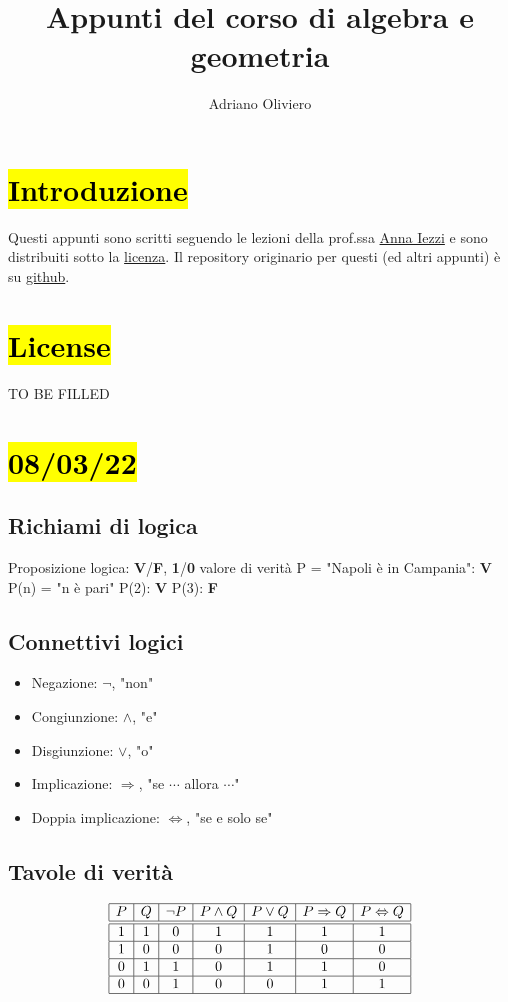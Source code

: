 \documentclass{article}
\begin{document}
% 
\newcommand{\Def}[2]{\paragraph{\underline{Def}:}#1\\\hspace*{3em}\begin{minipage}{.8\textwidth}#2\end{minipage}}
\newcommand{\R}{\mathbb{R}}
\title{Appunti del corso di algebra e geometria}
\author{Adriano Oliviero}
\section*{\hl{Introduzione}}
Questi appunti sono scritti seguendo le lezioni della prof.ssa \href{https://aiezzi.it/}{Anna Iezzi} e sono distribuiti sotto la \hyperref[sec:License]{licenza}. Il repository originario per questi (ed altri appunti) è su \href{https://github.com/TheDarkBug/notes}{github}.

\section*{\hl{License}}
\label{sec:License}
TO BE FILLED
\section*{\hl{08/03/22}}
\subsection*{Richiami di logica}
Proposizione logica: \textbf{V}/\textbf{F}, \textbf{1}/\textbf{0} valore di verità
P = "Napoli è in Campania": \textbf{V}
P(n) = "n è pari"
P(2): \textbf{V}
P(3): \textbf{F}
\subsection*{Connettivi logici}
\begin{itemize}
	\item Negazione: $\neg$, "non"
	\item Congiunzione: $\wedge$, "e"
	\item Disgiunzione: $\vee$, "o"
	\item Implicazione: $\Rightarrow$, "se $\cdots$ allora $\cdots$"
	\item Doppia implicazione: $\Leftrightarrow$, "se e solo se"
\end{itemize}
\subsection*{Tavole di verità}
\begin{displaymath}
\begin{array}{|c|c|c|c|c|c|c|c|c|c|c|}
\hline
P&Q&\neg P&P\wedge Q&P\vee Q&P\Rightarrow Q&P\Leftrightarrow Q\\
\hline\hline
1&1&0&1&1&1&1\\
\hline
1&0&0&0&1&0&0\\
\hline
0&1&1&0&1&1&0\\
\hline
0&0&1&0&0&1&1\\
\hline
\end{array}
\end{displaymath}
\end{document}

